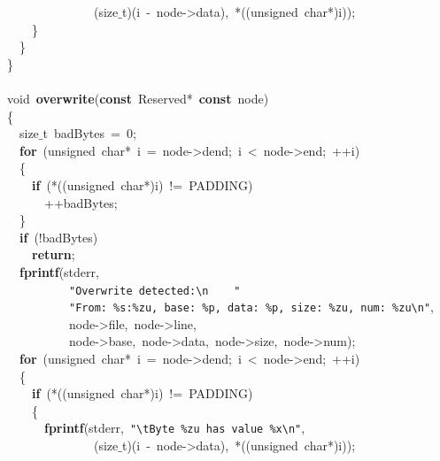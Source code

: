 \documentclass{article}
\begin{document}
\mbox{}\ \ \ \ \ \ \ \ \ \ \ \ \ \ (size$\_$t)(i\ -\ node-\textgreater{}data),\ *((unsigned\ char*)i)); \\
\mbox{}\ \ \ \ \} \\
\mbox{}\ \ \} \\
\mbox{}\} \\
\mbox{} \\
\mbox{}void\ \textbf{overwrite}(\textbf{const}\ Reserved*\ \textbf{const}\ node) \\
\mbox{}\{ \\
\mbox{}\ \ size$\_$t\ badBytes\ =\ 0; \\
\mbox{}\ \ \textbf{for}\ (unsigned\ char*\ i\ =\ node-\textgreater{}dend;\ i\ \textless{}\ node-\textgreater{}end;\ ++i) \\
\mbox{}\ \ \{ \\
\mbox{}\ \ \ \ \textbf{if}\ (*((unsigned\ char*)i)\ !=\ PADDING) \\
\mbox{}\ \ \ \ \ \ ++badBytes; \\
\mbox{}\ \ \} \\
\mbox{}\ \ \textbf{if}\ (!badBytes) \\
\mbox{}\ \ \ \ \textbf{return}; \\
\mbox{}\ \ \textbf{fprintf}(stderr, \\
\mbox{}\ \ \ \ \ \ \ \ \ \ \texttt{"{}Overwrite\ detected:}\texttt{\textbackslash{}n}\texttt{\ \ \ \ "{}} \\
\mbox{}\ \ \ \ \ \ \ \ \ \ \texttt{"{}From:\ \%s:\%zu,\ base:\ \%p,\ data:\ \%p,\ size:\ \%zu,\ num:\ \%zu}\texttt{\textbackslash{}n}\texttt{"{}}, \\
\mbox{}\ \ \ \ \ \ \ \ \ \ node-\textgreater{}file,\ node-\textgreater{}line, \\
\mbox{}\ \ \ \ \ \ \ \ \ \ node-\textgreater{}base,\ node-\textgreater{}data,\ node-\textgreater{}size,\ node-\textgreater{}num); \\
\mbox{}\ \ \textbf{for}\ (unsigned\ char*\ i\ =\ node-\textgreater{}dend;\ i\ \textless{}\ node-\textgreater{}end;\ ++i) \\
\mbox{}\ \ \{ \\
\mbox{}\ \ \ \ \textbf{if}\ (*((unsigned\ char*)i)\ !=\ PADDING) \\
\mbox{}\ \ \ \ \{ \\
\mbox{}\ \ \ \ \ \ \textbf{fprintf}(stderr,\ \texttt{"{}}\texttt{\textbackslash{}t}\texttt{Byte\ \%zu\ has\ value\ \%x}\texttt{\textbackslash{}n}\texttt{"{}}, \\
\mbox{}\ \ \ \ \ \ \ \ \ \ \ \ \ \ (size$\_$t)(i\ -\ node-\textgreater{}data),\ *((unsigned\ char*)i)); \\
\end{document}
